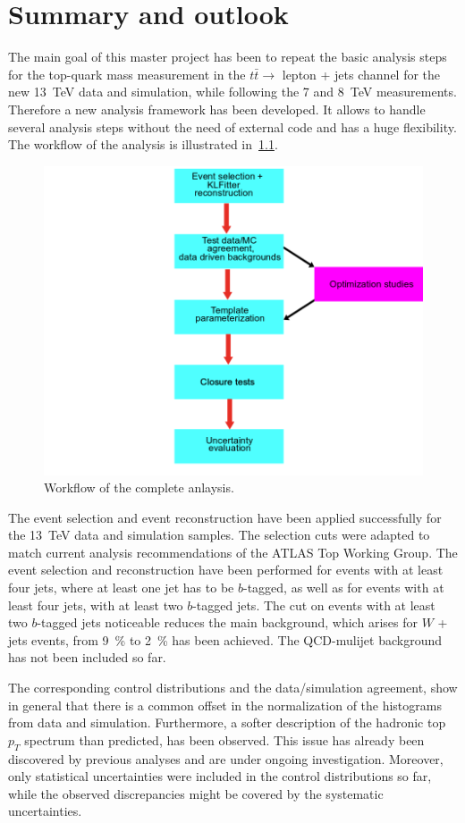 \chapter{Summary and outlook}
\label{sec:sum}

The main goal of this master project has been to repeat the basic analysis steps for the top-quark mass measurement in the $t\bar{t} \rightarrow $ lepton + jets channel for the new 13~TeV data and simulation, while following the  7 and 8~TeV measurements. Therefore a new analysis framework has been developed. It allows to handle several analysis steps without the need of external code and has a huge flexibility. The workflow of the analysis is illustrated in~\cref{fig:Workflow}.

\begin{figure}
	\center
	\includegraphics[width=0.6\linewidth]{Pics/Workflow}
	\caption{Workflow of the complete anlaysis.} \label{fig:Workflow}
\end{figure}

 The event selection and event reconstruction have been applied successfully for the 13~TeV data and simulation samples. The selection cuts were adapted to match current analysis recommendations of the ATLAS Top Working Group. The event selection and reconstruction have been performed for events with at least four jets, where at least one jet has to be $b$-tagged, as well as for events with at least four jets, with  at least two $b$-tagged jets.  The cut on events with at least two $b$-tagged jets noticeable reduces the main background, which arises for $W$  + jets events, from 9~\% to 2~\% has been  achieved. The QCD-mulijet background has not been included so far. 
 
 The corresponding control distributions and  the data/simulation agreement, show in general that there is a common offset in the normalization of the histograms from data and simulation. Furthermore, a softer description of the hadronic top $p_T$ spectrum than predicted, has been observed. This issue has already been discovered by previous analyses and are under ongoing investigation. Moreover, only statistical uncertainties were included in the control distributions so far, while the observed discrepancies might be covered by the systematic uncertainties.
 

